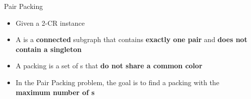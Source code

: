 \begin{frame}{Pair Packing}
\begin{itemize}


\item 
Given a 2-CR instance

\pause\item
A \alert{\pack{}} 
is a \textbf{connected} subgraph that contains \textbf{exactly one pair} 
and \textbf{does not contain a singleton} 
 
\pause\item
A \alert{packing} is a set of \pack{}s that \textbf{do not share a common color}

\pause\item
In the \alert{Pair Packing} problem,
the goal is to find a packing with the \textbf{maximum number of \pack{}s} 


\end{itemize}
\end{frame}